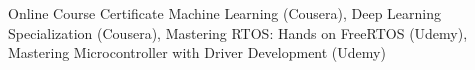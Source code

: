 

\begin{cvskills}

  \cvskill
    {Online Course Certificate} %
    {Machine Learning (Cousera), Deep Learning Specialization (Cousera), Mastering RTOS: Hands \linebreak on FreeRTOS (Udemy), Mastering Microcontroller with Driver Development (Udemy)} %


\end{cvskills}

